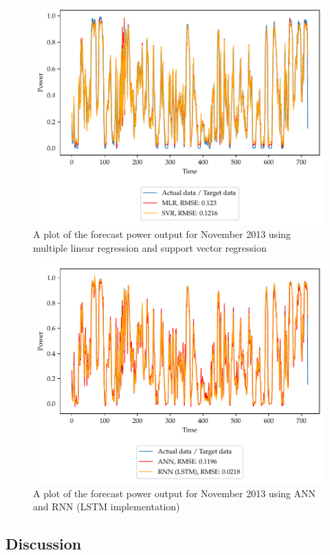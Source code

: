 \documentclass[11pt]{article}
\begin{document}
\begin{figure}
  \centering
  \includegraphics{figures/q3_forecast_plot1.pdf}
  \caption{A plot of the forecast power output for November 2013 using multiple linear regression and support vector regression}
  \label{fig:q3-forecast-1}
\end{figure}

\begin{figure}
  \centering
  \includegraphics{figures/q3_forecast_plot2.pdf}
  \caption{A plot of the forecast power output for November 2013 using ANN and RNN (LSTM implementation)}
  \label{fig:q3-forecast-2}
\end{figure}


\subsection*{Discussion}
\end{document}
